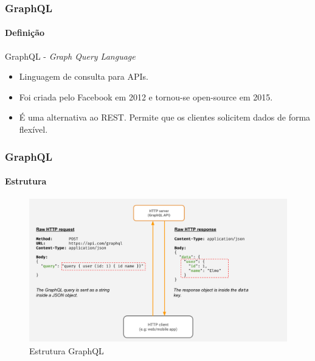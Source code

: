\documentclass[
	9pt, %
	t, %
]{beamer}
\begin{document}
\begin{frame}
	\frametitle{GraphQL}
	\framesubtitle{Definição}

	\begin{block}{GraphQL - \textit{Graph Query Language}}
		\begin{itemize}
			\item Linguagem de consulta para APIs.
			\item Foi criada pelo Facebook em 2012 e tornou-se open-source em 2015.
			\item É uma alternativa ao REST. Permite que os clientes solicitem dados de forma flexível.
		\end{itemize}
	\end{block}

\end{frame}

\begin{frame}
	\frametitle{GraphQL}
	\framesubtitle{Estrutura}

	\begin{figure}
		\includegraphics[width=0.9\linewidth]{graphql.png}
		\caption{Estrutura GraphQL}
		\label{fig:graphql_structure}
	\end{figure}

\end{frame}
\end{document}
